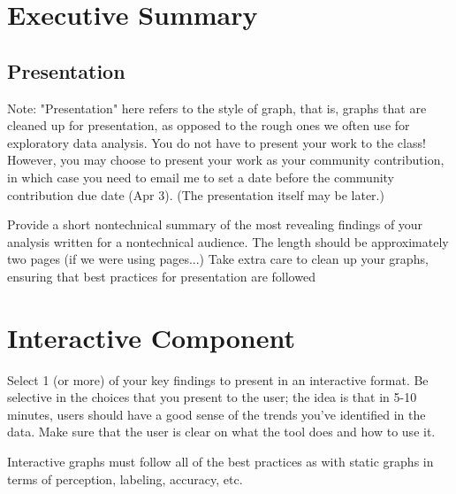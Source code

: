 \documentclass[11pt,fleqn]{book} %
\begin{document}


\chapter{Executive Summary}

\section{Presentation}

Note: "Presentation" here refers to the style of graph, that is, graphs that are cleaned up for presentation, as opposed to the rough ones we often use for exploratory data analysis. You do not have to present your work to the class! However, you may choose to present your work as your community contribution, in which case you need to email me to set a date before the community contribution due date (Apr 3). (The presentation itself may be later.)

Provide a short nontechnical summary of the most revealing findings of your analysis  written for a nontechnical audience. The length should be approximately two pages (if we were using pages...) Take extra care to clean up your graphs, ensuring that best practices for presentation are followed



\chapter{Interactive Component}

Select 1 (or more) of your key findings to present in an interactive format. Be selective in the choices that you present to the user; the idea is that in 5-10 minutes, users should have a good sense of the trends you've identified in the data.  Make sure that the user is clear on what the tool does and how to use it.

Interactive graphs must follow all of the best practices as with static graphs in terms of perception, labeling, accuracy, etc. 
\end{document}
